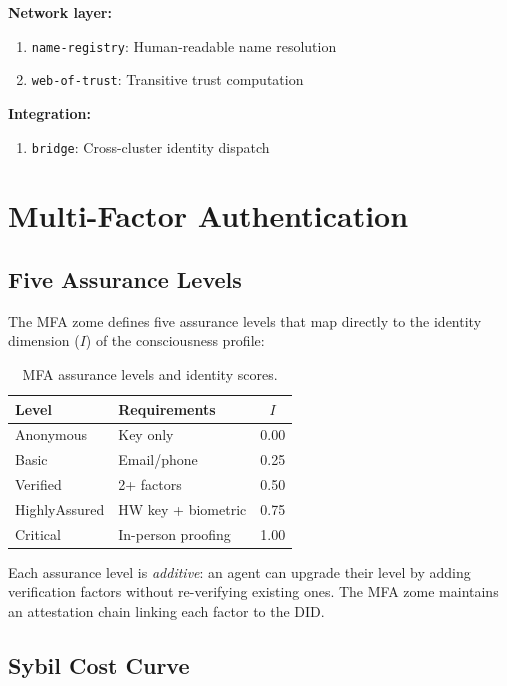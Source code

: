 \documentclass[11pt,twocolumn]{article}
\begin{document}
\textbf{Network layer:}
\begin{enumerate}[nosep,start=9]
  \item \texttt{name-registry}: Human-readable name resolution
  \item \texttt{web-of-trust}: Transitive trust computation
\end{enumerate}

\textbf{Integration:}
\begin{enumerate}[nosep,start=11]
  \item \texttt{bridge}: Cross-cluster identity dispatch
\end{enumerate}

\section{Multi-Factor Authentication}

\subsection{Five Assurance Levels}

The MFA zome defines five assurance levels that map directly to the identity
dimension ($I$) of the consciousness profile:

\begin{table}[h]
\centering
\begin{tabular}{llc}
\toprule
\textbf{Level} & \textbf{Requirements} & $I$ \\
\midrule
Anonymous & Key only & 0.00 \\
Basic & Email/phone & 0.25 \\
Verified & 2+ factors & 0.50 \\
HighlyAssured & HW key + biometric & 0.75 \\
Critical & In-person proofing & 1.00 \\
\bottomrule
\end{tabular}
\caption{MFA assurance levels and identity scores.}
\end{table}

Each assurance level is \emph{additive}: an agent can upgrade their level
by adding verification factors without re-verifying existing ones. The MFA
zome maintains an attestation chain linking each factor to the DID.

\subsection{Sybil Cost Curve}
\end{document}
